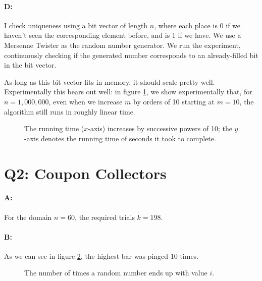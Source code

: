\documentclass[11pt]{article}
\begin{document}
\paragraph*{D:} 

I check uniqueness using a bit vector of length $n$, where each place is 0 if we haven't seen the corresponding element before, and is 1 if we have. We use a Mersenne Twister as the random number generator. We run the experiment, continuously checking if the generated number corresponds to an already-filled bit in the bit vector.

As long as this bit vector fits in memory, it should scale pretty well. Experimentally this bears out well: in figure \ref{fig:runningtimes1}, we show experimentally that, for $n = 1,000,000$, even when we increase $m$ by orders of 10 starting at $m=10$, the algorithm still runs in roughly linear time.


\begin{figure}[h]
\caption{The running time ($x$-axis) increases by successive powers of 10; the $y$-axis denotes the running time of seconds it took to complete.}
\label{fig:runningtimes1}
\end{figure}

\section*{Q2: Coupon Collectors}

\paragraph*{A:} For the domain $n = 60$, the required trials $k = 198$.

\paragraph*{B:} As we can see in figure \ref{fig:hist}, the highest bar was pinged 10 times.

\begin{figure}[h]
\caption{The number of times a random number ends up with value $i$.}
\label{fig:hist}
\end{figure}
\end{document}
